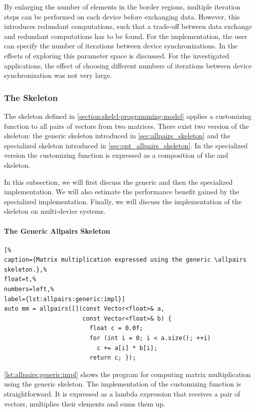 By enlarging the number of elements in the border regions, multiple iteration steps can be performed on each device before exchanging data.
However, this introduces redundant computations, such that a trade-off between data exchange and redundant computations has to be found.
For the  implementation, the user can specify the number of iterations between device synchronizations.
In \cite{Breuer2014} the effects of exploring this parameter space is discussed.
For the investigated applications, the effect of choosing different numbers of iterations between device synchronization was not very large.


\subsubsection{The \allpairs Skeleton}
The \allpairs skeleton defined in \autoref{section:skelcl-programming-model} applies a customizing function to all pairs of vectors from two matrices.
There exist two version of the skeleton: the generic \allpairs skeleton introduced in \autoref{sec:allpairs_skeleton} and the specialized \allpairs skeleton introduced in \autoref{sec:opt_allpairs_skeleton}.
In the specialized version the customizing function is expressed as a composition of the \zip and \reduce skeleton.

In this subsection, we will first discuss the generic and then the specialized implementation.
We will also estimate the performance benefit gained by the specialized implementation.
Finally, we will discuss the implementation of the \allpairs skeleton on multi-device systems.

\paragraph{The Generic Allpairs Skeleton}
\begin{lstlisting}[%
caption={Matrix multiplication expressed using the generic \allpairs skeleton.},%
float=t,%
numbers=left,%
label={lst:allpairs:generic:impl}]
auto mm = allpairs([](const Vector<float>& a,
                      const Vector<float>& b) {
                        float c = 0.0f;
                        for (int i = 0; i < a.size(); ++i)
                          c += a[i] * b[i];
                        return c; });
\end{lstlisting}

\autoref{lst:allpairs:generic:impl} shows the program for computing matrix multiplication using the generic \allpairs skeleton.
The implementation of the customizing function is straightforward.
It is expressed as a lambda expression that receives a pair of vectors, multiplies their elements and sums them up.

